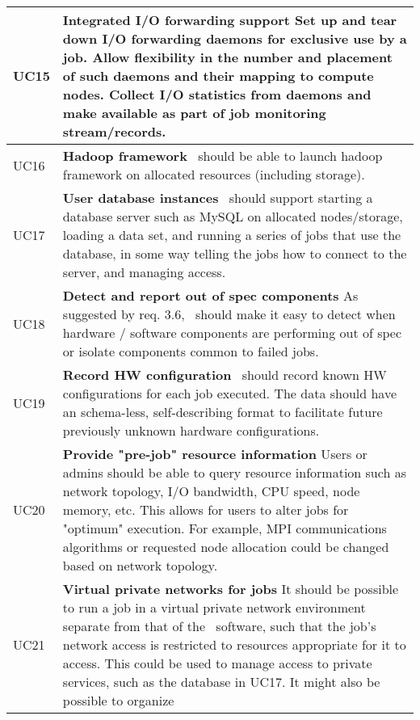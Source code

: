 \begin{longtable}{|p{1cm}|p{15cm}|}
  \hline
  UC15 & \textbf{Integrated I/O forwarding support}\newline
	Set up and tear down I/O forwarding daemons for exclusive use by
	a job. Allow flexibility in the number and placement of such daemons
	and their mapping to compute nodes. Collect I/O statistics from
	daemons and make available as part of job monitoring stream/records.\\
  \hline
  UC16 & \textbf{Hadoop framework}\newline
	\ngrm\ should be able to launch hadoop framework on allocated resources
	(including storage).\\
  \hline
  UC17 & \textbf{User database instances}\newline
	\ngrm\ should support starting a database server such as MySQL on
	allocated nodes/storage, loading a data set, and running a series of
	jobs that use the database, in some way telling the jobs how to
	connect to the server, and managing access.\\
  \hline
  UC18 & \textbf{Detect and report out of spec components}\newline
	As suggested by req. 3.6, \ngrm\ should make it easy to detect when
	hardware / software components are performing out of spec or isolate
	components common to failed jobs.\\
  \hline
  UC19 & \textbf{Record HW configuration}\newline
	\ngrm\ should record known HW configurations for each job executed.
	The data should have an schema-less, self-describing format to
	facilitate future previously unknown hardware configurations.\\
  \hline
  UC20 & \textbf{Provide "pre-job" resource information}\newline
	Users or admins should be able to query resource information such as
	network topology, I/O bandwidth, CPU speed, node memory, etc.
	This allows for users to alter jobs for "optimum" execution.
	For example, MPI communications algorithms or requested node
	allocation could be changed based on network topology.\\
  \hline
  UC21 & \textbf{Virtual private networks for jobs}\newline
	It should be possible to run a job in a virtual private network
	environment separate from that of the \ngrm\ software, such that the
	job's network access is restricted to resources appropriate for it
	to access. This could be used to manage access to private services,
	such as the database in UC17. It might also be possible to organize

\end{longtable}
